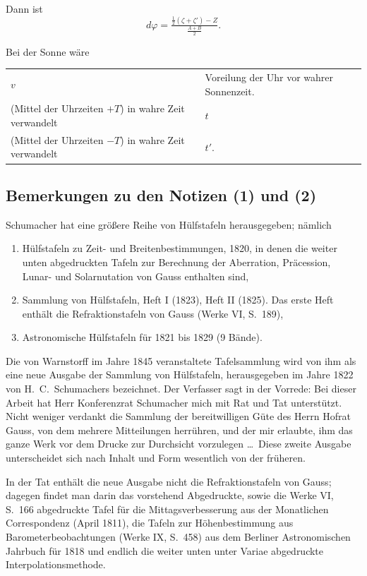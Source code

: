 \documentclass[12pt,a4paper]{article}
\theoremstyle{plain}
\theoremstyle{definition}
\theoremstyle{remark}
\begin{document}
Dann ist
\[
d\varphi = \tfrac{\tfrac{1}{2}(\zeta + \zeta') - Z}{\tfrac{A+B}{2}}.
\]

Bei der Sonne w\"are
\begin{center}
\begin{tabular}{l@{ $=$ }l}
$v$ & Voreilung der Uhr vor wahrer Sonnenzeit. \\
(Mittel der Uhrzeiten $+T$) in wahre Zeit verwandelt & $t$ \\
(Mittel der Uhrzeiten $-T$) in wahre Zeit verwandelt & $t'$.
\end{tabular}
\end{center}

\newpage

\subsection*{Bemerkungen zu den Notizen (1) und (2)}

Schumacher hat eine gr\"o\ss ere Reihe von \glqq H\"ulfstafeln\grqq{} herausgegeben; n\"amlich
\begin{enumerate}[label=\arabic*)]
\item H\"ulfstafeln zu Zeit- und Breitenbestimmungen, 1820, in denen die weiter unten abgedruckten \glqq Tafeln zur Berechnung der Aberration, Pr\"acession, Lunar- und Solarnutation\grqq{} von Gauss enthalten sind,
\item Sammlung von H\"ulfstafeln, Heft I (1823), Heft II (1825). Das erste Heft enth\"alt die Refraktionstafeln von Gauss (Werke VI, S.~189),
\item Astronomische H\"ulfstafeln f\"ur 1821 bis 1829 (9 B\"ande).
\end{enumerate}

Die von Warnstorff im Jahre 1845 veranstaltete Tafelsammlung wird von ihm als eine neue Ausgabe der \glqq Sammlung von H\"ulfstafeln, herausgegeben im Jahre 1822 von H.\ C.\ Schumachers\grqq{} bezeichnet. Der Verfasser sagt in der Vorrede: \glqq Bei dieser Arbeit hat Herr Konferenzrat Schumacher mich mit Rat und Tat unterst\"utzt. Nicht weniger verdankt die Sammlung der bereitwilligen G\"ute des Herrn Hofrat Gauss, von dem mehrere Mitteilungen herr\"uhren, und der mir erlaubte, ihm das ganze Werk vor dem Drucke zur Durchsicht vorzulegen \ldots\ Diese zweite Ausgabe unterscheidet sich nach Inhalt und Form wesentlich von der fr\"uheren.\grqq

In der Tat enth\"alt die neue Ausgabe nicht die Refraktionstafeln von Gauss; dagegen findet man darin das vorstehend Abgedruckte, sowie die Werke VI, S.~166 abgedruckte \glqq Tafel f\"ur die Mittagsverbesserung\grqq{} aus der Monatlichen Correspondenz (April 1811), die Tafeln zur H\"ohenbestimmung aus Barometerbeobachtungen (Werke IX, S.~458) aus dem Berliner Astronomischen Jahrbuch f\"ur 1818 und endlich die weiter unten unter \glqq Variae\grqq{} abgedruckte \glqq Interpolationsmethode\grqq{}.
\end{document}

